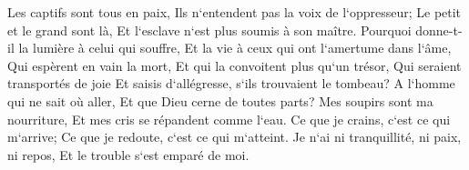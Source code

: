 \verse Les captifs sont tous en paix, Ils n`entendent pas la voix de l`oppresseur; 
\verse Le petit et le grand sont là, Et l`esclave n`est plus soumis à son maître. 
\verse Pourquoi donne-t-il la lumière à celui qui souffre, Et la vie à ceux qui ont l`amertume dans l`âme, 
\verse Qui espèrent en vain la mort, Et qui la convoitent plus qu`un trésor, 
\verse Qui seraient transportés de joie Et saisis d`allégresse, s`ils trouvaient le tombeau? 
\verse A l`homme qui ne sait où aller, Et que Dieu cerne de toutes parts? 
\verse Mes soupirs sont ma nourriture, Et mes cris se répandent comme l`eau. 
\verse Ce que je crains, c`est ce qui m`arrive; Ce que je redoute, c`est ce qui m`atteint. 
\verse Je n`ai ni tranquillité, ni paix, ni repos, Et le trouble s`est emparé de moi. 

